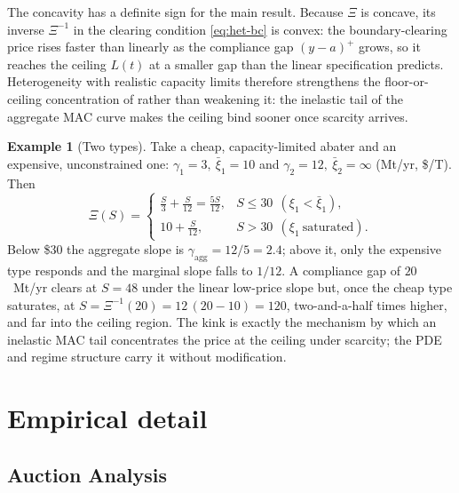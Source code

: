 \documentclass[11pt,letterpaper]{article}
\theoremstyle{plain}
\theoremstyle{definition}
\newtheorem{example}[theorem]{Example}
\numberwithin{equation}{section}
\begin{document}
The concavity has a definite sign for the main result. Because $\Xi$ is concave, its inverse $\Xi^{-1}$ in the clearing condition \eqref{eq:het-bc} is convex: the boundary-clearing price rises faster than linearly as the compliance gap $(y-a)^{+}$ grows, so it reaches the ceiling $L(t)$ at a smaller gap than the linear specification predicts. Heterogeneity with realistic capacity limits therefore strengthens the floor-or-ceiling concentration of \citet{borenstein2019} rather than weakening it: the inelastic tail of the aggregate MAC curve makes the ceiling bind sooner once scarcity arrives.

\begin{example}[Two types]\label{ex:twotype}
Take a cheap, capacity-limited abater and an expensive, unconstrained one: $\gamma_1=3,\ \bar\xi_1=10$ and $\gamma_2=12,\ \bar\xi_2=\infty$ (Mt/yr, \$/T). Then
\[
  \Xi(S)=\begin{cases}
    \tfrac{S}{3}+\tfrac{S}{12}=\tfrac{5S}{12}, & S\le 30\ \ (\xi_1<\bar\xi_1),\\[4pt]
    10+\tfrac{S}{12}, & S>30\ \ (\xi_1\ \text{saturated}).
  \end{cases}
\]
Below \$30 the aggregate slope is $\gamma_{\mathrm{agg}}=12/5=2.4$; above it, only the expensive type responds and the marginal slope falls to $1/12$. A compliance gap of $20$~Mt/yr clears at $S=48$ under the linear low-price slope but, once the cheap type saturates, at $S=\Xi^{-1}(20)=12\,(20-10)=120$, two-and-a-half times higher, and far into the ceiling region. The kink is exactly the mechanism by which an inelastic MAC tail concentrates the price at the
ceiling under scarcity; the PDE and regime structure carry it without modification.
\end{example}



\section{Empirical detail}\label{app:empirics}

\subsection{Auction Analysis}\label{app:auc}
\end{document}
